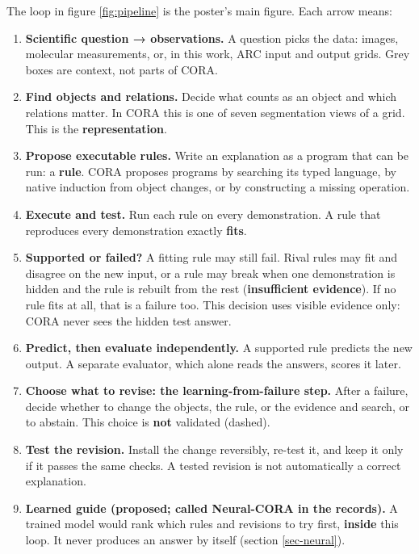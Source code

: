 \documentclass[11pt, a4paper]{article}
\begin{document}
The loop in figure \ref{fig:pipeline} is the poster's main figure. Each arrow means:

\begin{enumerate}
\item \textbf{Scientific question → observations.} A question picks the data: images, molecular measurements, or, in this work, ARC
input and output grids. Grey boxes are context, not parts of CORA.
\item \textbf{Find objects and relations.} Decide what counts as an object and which relations matter. In CORA this is one of seven
segmentation views of a grid. This is the \textbf{representation}.
\item \textbf{Propose executable rules.} Write an explanation as a program that can be run: a \textbf{rule}. CORA proposes programs by
searching its typed language, by native induction from object changes, or by constructing a missing operation.
\item \textbf{Execute and test.} Run each rule on every demonstration. A rule that reproduces every demonstration exactly \textbf{fits}.
\item \textbf{Supported or failed?} A fitting rule may still fail. Rival rules may fit and disagree on the new input, or a rule
may break when one demonstration is hidden and the rule is rebuilt from the rest (\textbf{insufficient evidence}). If no
rule fits at all, that is a failure too. This decision uses visible evidence only: CORA never sees the hidden test
answer.
\item \textbf{Predict, then evaluate independently.} A supported rule predicts the new output. A separate evaluator, which alone
reads the answers, scores it later.
\item \textbf{Choose what to revise: the learning-from-failure step.} After a failure, decide whether to change the objects,
the rule, or the evidence and search, or to abstain. This choice is \textbf{not} validated (dashed).
\item \textbf{Test the revision.} Install the change reversibly, re-test it, and keep it only if it passes the same checks. A
tested revision is not automatically a correct explanation.
\item \textbf{Learned guide (proposed; called Neural-CORA in the records).} A trained model would rank which rules and
revisions to try first, \textbf{inside} this loop. It never produces an answer by itself (section \ref{sec-neural}).
\end{enumerate}
\end{document}
